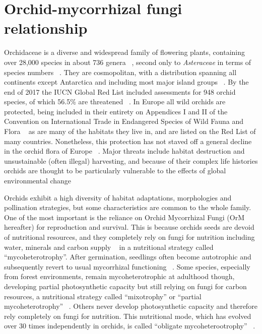 \chapter{Orchid-mycorrhizal fungi relationship}
\label{orchid-mycorrhizalfungirelationship}

Orchidaceae is a diverse and widespread family of flowering plants, containing over 28,000 species in about 736 genera ~\citep{christenhusz2016}, second only to \emph{Asteraceae} in terms of species numbers ~\citep{ramirez2007}. They are cosmopolitan, with a distribution spanning all continents except Antarctica and including most major island groups ~\citep{givnish2016}.
By the end of 2017 the IUCN Global Red List included assessments for 948 orchid species, of which 56.5\% are threatened ~\citep{fay2018}. In Europe all wild orchids are protected, being included in their entirety on Appendices I and II of the Convention on International Trade in Endangered Species of Wild Fauna and Flora ~\citep{CITES-1} as are many of the habitats they live in, and are listed on the Red List of many countries. Nonetheless, this protection has not staved off a general decline in the orchid flora of Europe ~\citep{jacquemyn2005, kull2006}. Major threats include habitat destruction and unsustainable (often illegal) harvesting, and because of their complex life histories orchids are thought to be particularly vulnerable to the effects of global environmental change ~\citep{kull2016, gale2018}

Orchids exhibit a high diversity of habitat adaptations, morphologies and pollination strategies, but some characteristics are common to the whole family. One of the most important is the reliance on Orchid Mycorrhizal Fungi (OrM hereafter) for reproduction and survival. This is because orchids seeds are devoid of nutritional resources, and they completely rely on fungi for nutrition including water, minerals and carbon supply ~\citep{leake1994, rasmussen1998, merckx2013} in a nutritional strategy called ``mycoheterotrophy''. After germination, seedlings often become autotrophic and subsequently revert to usual mycorrhizal functioning ~\citep{rasmussen1995, cameron2008}. Some species, especially from forest environments, remain mycoheterotrophic at adulthood though, developing partial photosynthetic capacity but still relying on fungi for carbon resources, a nutritional strategy called ``mixotrophy'' or ``partial mycoheterotrophy'' ~\citep{gebauer2003, julou2005, selosse2009}. Others never develop photosynthetic capacity and therefore rely completely on fungi for nutrition. This nutritional mode, which has evolved over 30 times independently in orchids, is called ``obligate mycoheterootrophy'' ~\citep{merckx2013}.

